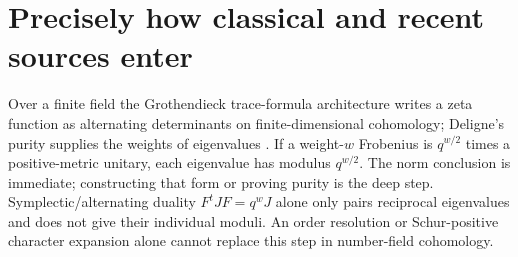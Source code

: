 \documentclass[11pt,oneside,openany]{book}
\theoremstyle{definition}\newtheorem{definition}[theorem]{Definition}
\theoremstyle{remark}\newtheorem{remark}[theorem]{Remark}
\begin{document}
\section{Precisely how classical and recent sources enter}
Over a finite field the Grothendieck trace-formula architecture writes a zeta function as alternating determinants on finite-dimensional cohomology; Deligne's purity supplies the weights of eigenvalues \cite{SGAFourHalf,DeligneWeilI,DeligneWeilII}. If a weight-$w$ Frobenius is $q^{w/2}$ times a positive-metric unitary, each eigenvalue has modulus $q^{w/2}$. The norm conclusion is immediate; constructing that form or proving purity is the deep step. Symplectic/alternating duality $F^tJF=q^wJ$ alone only pairs reciprocal eigenvalues and does not give their individual moduli. An order resolution or Schur-positive character expansion alone cannot replace this step in number-field cohomology.
\end{document}
